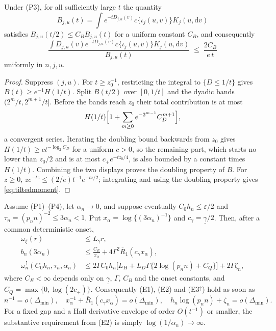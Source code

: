 \begin{lemma}\label{lem:app-tilted}
Under (P3), for all sufficiently large $t$ the quantity
\[
 B_{j,u}(t)=\int e^{-tD_{j,u}(v)}c\{\iota_j(u,v)\}K_j(u,\mathrm dv)
\]
satisfies $B_{j,u}(t/2)\le C_BB_{j,u}(t)$ for a uniform constant $C_B$,
and consequently
\begin{equation}\label{eq:tiltedmoment}
 \frac{\int D_{j,u}(v)e^{-tD_{j,u}(v)}c\{\iota_j(u,v)\}K_j(u,\mathrm dv)}
      {B_{j,u}(t)}
 \;\le\;\frac{2C_B}{e\,t}
\end{equation}
uniformly in $n,j,u$.
\end{lemma}

\begin{proof}
Suppress $(j,u)$. For $t\ge z_0^{-1}$, restricting the integral to
$\{D\le1/t\}$ gives $B(t)\ge e^{-1}H(1/t)$. Split $B(t/2)$ over
$[0,1/t]$ and the dyadic bands $(2^m/t,2^{m+1}/t]$. Before the bands
reach $z_0$ their total contribution is at most
\[
 H(1/t)\Bigl[1+\sum_{m\ge0}e^{-2^{m-1}}C_D^{m+1}\Bigr],
\]
a convergent series. Iterating the doubling bound backwards from $z_0$
gives $H(1/t)\ge ct^{-\log_2C_D}$ for a uniform $c>0$, so the remaining
part, which starts no lower than $z_0/2$ and is at most
$c_+e^{-tz_0/4}$, is also bounded by a constant times $H(1/t)$.
Combining the two displays proves the doubling property of $B$. For
$z\ge0$, $ze^{-tz}\le(2/e)t^{-1}e^{-tz/2}$; integrating and using the
doubling property gives \eqref{eq:tiltedmoment}.
\end{proof}

\begin{theorem}\label{thm:app-transfer}
Assume (P1)--(P4), let $\alpha_n\to0$, and suppose eventually
$C_0h_n\le\varepsilon/2$ and $\tau_n=(p_nn)^{-2}\le3\alpha_n<1$. Put
$x_\alpha=\log\{(3\alpha_n)^{-1}\}$ and $c_\gamma=\underline\gamma/2$.
Then, after a common deterministic onset,
\begin{align}
 \omega_\xi(r)&\le L_\gamma r, \label{eq:transfer-E1}\\
 b_n(3\alpha_n)&\le\frac{C_E}{x_\alpha}
 +4\Gamma^2\overline R_1(c_\gamma x_\alpha), \label{eq:transfer-E2}\\
 \omega_n^{\uparrow}(C_0h_n,\tau_n,\alpha_n)
 &\le2\Gamma C_0h_n\bigl[L_H+L_D\Gamma\{2\log(p_nn)+C_Q\}\bigr]
 +2\Gamma\zeta_n, \label{eq:transfer-E3}
\end{align}
where $C_E<\infty$ depends only on $\underline\gamma$, $\Gamma$, $C_B$
and the onset constants, and $C_Q=\max\{0,\log(2c_+)\}$. Consequently
(E1), (E2) and (E3$^\uparrow$) hold as soon as
\begin{equation}\label{eq:transfer-rates}
 n^{-1}=o(\Delta_{\min}),
 \quad
 x_\alpha^{-1}+\overline R_1(c_\gamma x_\alpha)=o(\Delta_{\min}),
 \quad
 h_n\log(p_nn)+\zeta_n=o(\Delta_{\min}).
\end{equation}
For a fixed gap and a Hall derivative envelope of order $O(t^{-1})$ or
smaller, the substantive requirement from (E2) is simply
$\log(1/\alpha_n)\to\infty$.
\end{theorem}

